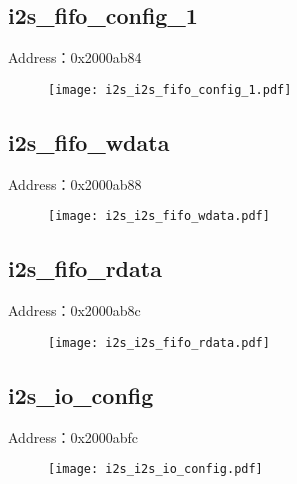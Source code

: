 \subsection{i2s\_fifo\_config\_1}
\label{i2s-i2s-fifo-config-1}
Address：0x2000ab84
 \begin{figure}[H]
\texttt{[image: i2s\_i2s\_fifo\_config\_1.pdf]}
\end{figure}

\subsection{i2s\_fifo\_wdata}
\label{i2s-i2s-fifo-wdata}
Address：0x2000ab88
 \begin{figure}[H]
\texttt{[image: i2s\_i2s\_fifo\_wdata.pdf]}
\end{figure}

\subsection{i2s\_fifo\_rdata}
\label{i2s-i2s-fifo-rdata}
Address：0x2000ab8c
 \begin{figure}[H]
\texttt{[image: i2s\_i2s\_fifo\_rdata.pdf]}
\end{figure}

\subsection{i2s\_io\_config}
\label{i2s-i2s-io-config}
Address：0x2000abfc
 \begin{figure}[H]
\texttt{[image: i2s\_i2s\_io\_config.pdf]}
\end{figure}

